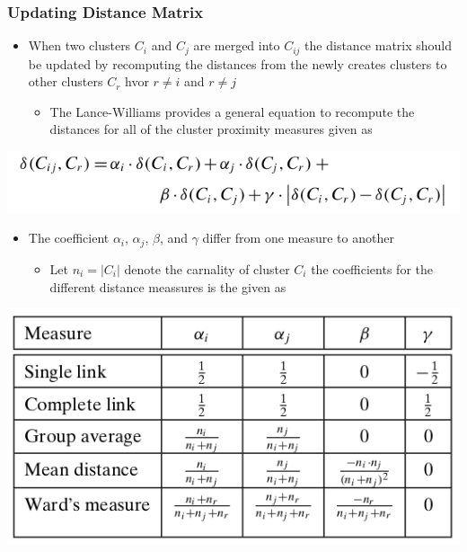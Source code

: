 \documentclass[11pt]{article}
\begin{document}
\subsubsection{Updating Distance Matrix}
\label{sec:org9e5cb11}
\begin{itemize}
\item When two clusters \(C_i\) and \(C_j\) are merged into \(C_{ij}\) the distance matrix should be updated by recomputing the distances from the newly creates clusters to other clusters \(C_r\) hvor \(r \ne i\) and \(r \ne j\)
\begin{itemize}
\item The Lance-Williams provides a general equation to recompute the distances for all of the cluster proximity measures given as
\end{itemize}
\end{itemize}
\begin{center}
\includegraphics[width=.9\linewidth]{Hierarchical Clustering/screenshot_2018-12-01_11-48-09.png}
\end{center}
\begin{itemize}
\item The coefficient \(\alpha_i\), \(\alpha_j\), \(\beta\), and \(\gamma\) differ from one measure to another
\begin{itemize}
\item Let \(n_i = |C_i|\) denote the carnality of cluster \(C_i\) the coefficients for the different distance meassures is the given as
\end{itemize}
\end{itemize}
\begin{center}
\includegraphics[width=.9\linewidth]{Hierarchical Clustering/screenshot_2018-12-01_11-51-06.png}
\end{center}
\end{document}
